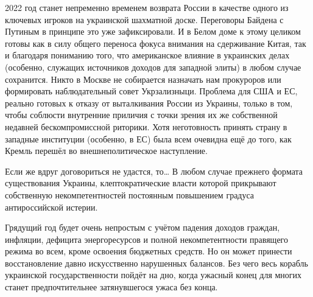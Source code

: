 2022 год станет непременно временем возврата России в качестве одного из
ключевых игроков на украинской шахматной доске. Переговоры Байдена с Путиным в
принципе это уже зафиксировали. И в Белом доме к этому целиком готовы как в
силу общего переноса фокуса внимания на сдерживание Китая, так и благодаря
пониманию того, что американское влияние в украинских делах (особенно, служащих
источников доходов для западной элиты) в любом случае сохранится. Никто в
Москве не собирается назначать нам прокуроров или формировать наблюдательный
совет Укрзализныци. Проблема для США и ЕС, реально готовых к отказу от
выталкивания России из Украины, только в том, чтобы соблюсти внутренние
приличия с точки зрения их же собственной недавней бескомпромиссной риторики.
Хотя неготовность принять страну в западные институции (особенно, в ЕС) была
всем очевидна ещё до того, как Кремль перешёл во внешнеполитическое
наступление. 

Если же вдруг договориться не удастся, то… В любом случае прежнего формата
существования Украины, клептократические власти которой прикрывают собственную
некомпетентностей постоянным повышением градуса антироссийской истерии. 

Грядущий год будет очень непростым с учётом падения доходов граждан, инфляции,
дефицита энергоресурсов и полной некомпетентности правящего режима во всем,
кроме освоения бюджетных средств. Но он может принести восстановление давно
искусственно нарушенных балансов. Без чего весь корабль украинской
государственности пойдёт на дно, когда ужасный конец для многих станет
предпочтительнее затянувшегося ужаса без конца.

